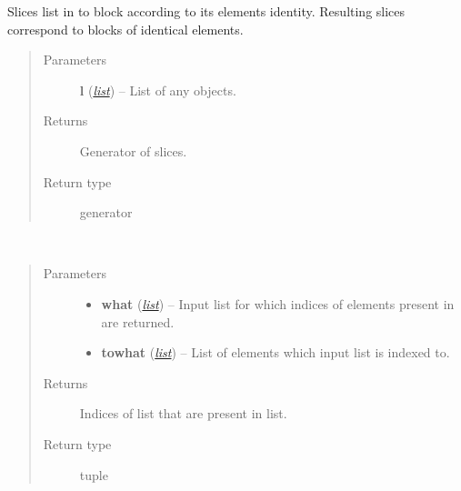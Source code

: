 \documentclass[a4paper,10pt,english]{sphinxmanual}
\begin{document}

\begin{fulllineitems}
\label{aqueduct.utils.helpers:aqueduct.utils.helpers.list_blocks_to_slices}
Slices list in to block according to its elements identity. Resulting slices correspond to blocks of
identical elements.
\begin{quote}\begin{description}
\item[{Parameters}] \leavevmode
\textbf{l} (\href{http://docs.python.org/2/library/functions.html\#list}{\emph{list}}) -- List of any objects.

\item[{Returns}] \leavevmode
Generator of slices.

\item[{Return type}] \leavevmode
generator

\end{description}\end{quote}

\end{fulllineitems}


\begin{fulllineitems}
\label{aqueduct.utils.helpers:aqueduct.utils.helpers.what2what}~\begin{quote}\begin{description}
\item[{Parameters}] \leavevmode\begin{itemize}
\item {} 
\textbf{what} (\href{http://docs.python.org/2/library/functions.html\#list}{\emph{list}}) -- Input list for which indices of elements present in  are returned.

\item {} 
\textbf{towhat} (\href{http://docs.python.org/2/library/functions.html\#list}{\emph{list}}) -- List of elements which input list is indexed to.

\end{itemize}

\item[{Returns}] \leavevmode
Indices of  list that are present in  list.

\item[{Return type}] \leavevmode
tuple

\end{description}\end{quote}

\end{fulllineitems}
\end{document}

